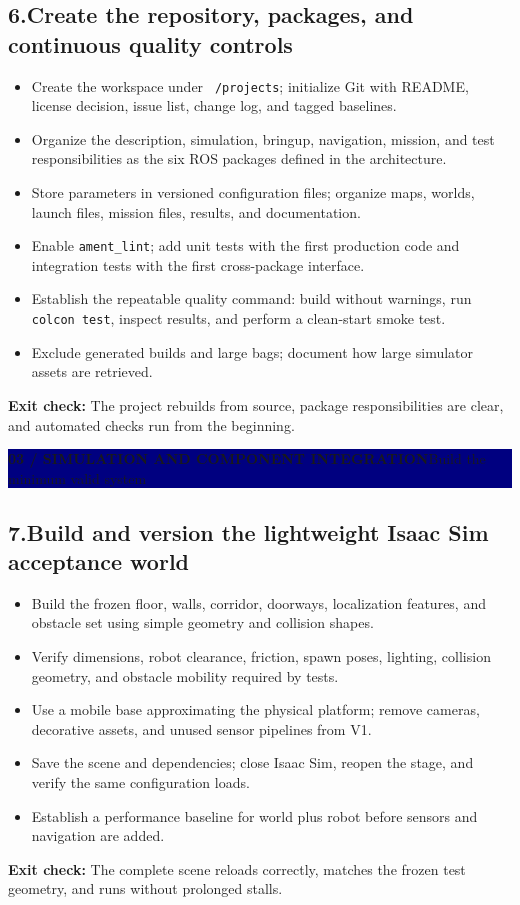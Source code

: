 \documentclass[10pt,a4paper]{article}
\newcommand{\cb}{\(\square\)}
\newcommand{\exitcheck}[1]{\vspace{2pt}\colorbox{PaleTeal}{\parbox{0.965\linewidth}{\textbf{Exit check:} #1}}}
\newcommand{\workstep}[2]{\subsection{\texorpdfstring{#1\quad #2}{#1\ #2}}}
\newcommand{\stagebanner}[2]{%
  \vspace{2pt}
  \noindent\colorbox{Navy}{\parbox{0.965\linewidth}{\color{white}\textbf{#1}\hfill #2}}
  \vspace{2pt}
}
\begin{document}
\workstep{6.}{Create the repository, packages, and continuous quality controls}
\begin{itemize}
  \item[\cb] Create the workspace under \texttt{~/projects}; initialize Git with README, license decision, issue list, change log, and tagged baselines.
  \item[\cb] Organize the description, simulation, bringup, navigation, mission, and test responsibilities as the six ROS packages defined in the architecture.
  \item[\cb] Store parameters in versioned configuration files; organize maps, worlds, launch files, mission files, results, and documentation.
  \item[\cb] Enable \texttt{ament\_lint}; add unit tests with the first production code and integration tests with the first cross-package interface.
  \item[\cb] Establish the repeatable quality command: build without warnings, run \texttt{colcon test}, inspect results, and perform a clean-start smoke test.
  \item[\cb] Exclude generated builds and large bags; document how large simulator assets are retrieved.
\end{itemize}
\exitcheck{The project rebuilds from source, package responsibilities are clear, and automated checks run from the beginning.}

\newpage
\stagebanner{03 / SIMULATION AND COMPONENT INTEGRATION}{Build the minimum valid system}

\workstep{7.}{Build and version the lightweight Isaac Sim acceptance world}
\begin{itemize}
  \item[\cb] Build the frozen floor, walls, corridor, doorways, localization features, and obstacle set using simple geometry and collision shapes.
  \item[\cb] Verify dimensions, robot clearance, friction, spawn poses, lighting, collision geometry, and obstacle mobility required by tests.
  \item[\cb] Use a mobile base approximating the physical platform; remove cameras, decorative assets, and unused sensor pipelines from V1.
  \item[\cb] Save the scene and dependencies; close Isaac Sim, reopen the stage, and verify the same configuration loads.
  \item[\cb] Establish a performance baseline for world plus robot before sensors and navigation are added.
\end{itemize}
\exitcheck{The complete scene reloads correctly, matches the frozen test geometry, and runs without prolonged stalls.}
\end{document}

